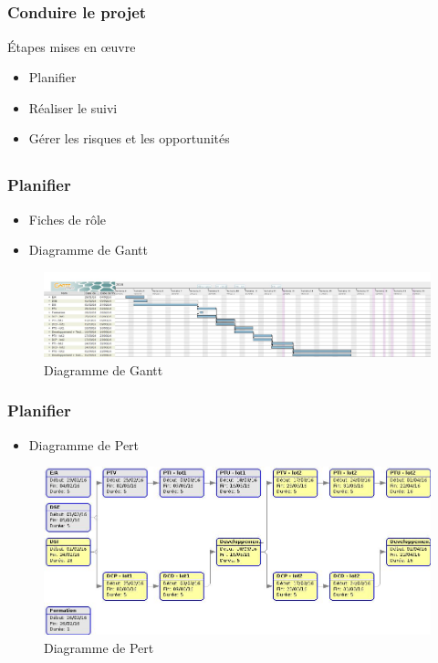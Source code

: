 \speaker{\Sergi{}}
\subsection{} %

\begin{frame}
\frametitle{Conduire le projet}
Étapes mises en \oe{}uvre
	\begin{itemize}
		\item Planifier
		\item Réaliser le suivi
		\item Gérer les risques et les opportunités
	\end{itemize}
\end{frame}

\subsection{}

\begin{frame}
\frametitle{Planifier}
\begin{itemize}
	\item Fiches de rôle
	\item Diagramme de Gantt
\end{itemize}
\begin{figure}
\begin{center}
	\includegraphics[scale=0.15]{images/exempleGantt.jpg}
	\caption{Diagramme de Gantt}
	\label{DG}
\end{center}
\end{figure}
\end{frame}

\begin{frame}
\frametitle{Planifier}
\begin{itemize}
\item Diagramme de Pert
\end{itemize}
\begin{figure}
\includegraphics[scale=0.3]{images/exemplePert.jpg}
\caption{Diagramme de Pert}
\label{DP}
\end{figure}
\end{frame}

